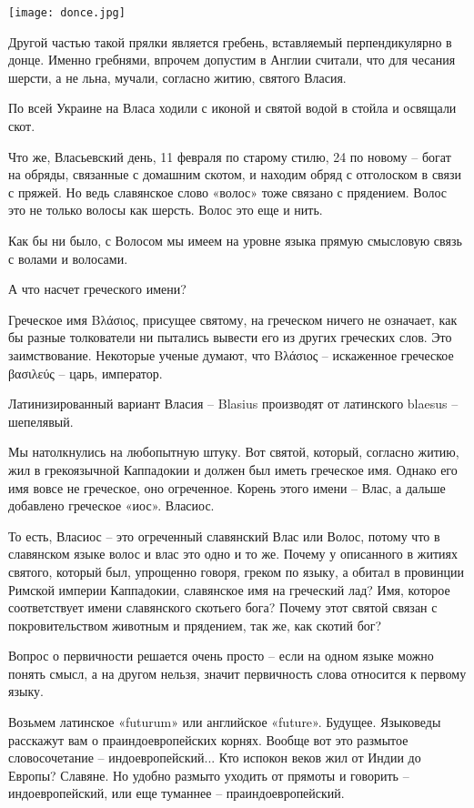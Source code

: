 \documentclass[a5paper,11pt,openany]{article}
\begin{document}
\begin{center}
\texttt{[image: donce.jpg]}
\end{center}

  Другой частью такой прялки является гребень, вставляемый перпендикулярно в донце. Именно гребнями, впрочем допустим в Англии считали, что для чесания шерсти, а не льна, мучали, согласно житию, святого Власия.

   По всей Украине на Власа ходили с иконой и святой водой в стойла и освящали скот.

  Что же, Власьевский день, 11 февраля по старому стилю, 24 по новому – богат на обряды, связанные с домашним скотом, и находим обряд с отголоском в связи с пряжей. Но ведь славянское слово «волос» тоже связано с прядением. Волос это не только волосы как шерсть. Волос это еще и нить.

   Как бы ни было, с Волосом мы имеем на уровне языка прямую смысловую связь с волами и волосами.

   А что насчет греческого имени?

  Греческое имя Βλάσιος, присущее святому, на греческом ничего не означает, как бы разные толкователи ни пытались вывести его из других греческих слов. Это заимствование. Некоторые ученые думают, что Βλάσιος – искаженное греческое βασιλεύς – царь, император.

 Латинизированный вариант Власия –  Blasius производят от латинского blaesus – шепелявый.

Мы натолкнулись на любопытную штуку. Вот святой, который, согласно житию, жил в грекоязычной Каппадокии и должен был иметь греческое имя. Однако его имя вовсе не греческое, оно огреченное. Корень этого имени – Влас, а дальше добавлено греческое «иос». Власиос.

   То есть, Власиос – это огреченный славянский Влас или Волос, потому что в славянском языке волос и влас это одно и то же. Почему у описанного в житиях святого, который был, упрощенно говоря, греком по языку, а обитал в провинции Римской империи Каппадокии, славянское имя на греческий лад? Имя, которое соответствует имени славянского скотьего бога? Почему этот святой связан с покровительством животным и прядением, так же, как скотий бог?

  Вопрос о первичности решается очень просто – если на одном языке можно понять смысл, а на другом нельзя, значит первичность слова относится к первому языку.

    Возьмем латинское «futurum» или английское «future». Будущее. Языковеды расскажут вам о праиндоевропейских корнях. Вообще вот это размытое словосочетание – индоевропейский... Кто испокон веков жил от Индии до Европы? Славяне. Но удобно размыто уходить от прямоты и говорить – индоевропейский, или еще туманнее – праиндоевропейский.
\end{document}

